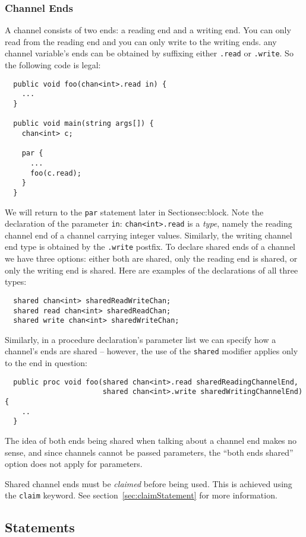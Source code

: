 \documentclass[pdflatex,11pt,letter]{article}
\begin{document}
 


\subsubsection{Channel Ends}

A channel consists of two ends: a reading end and a writing end. You can only read from the reading end and you can only write to the writing ends. any channel variable's ends can be obtained by suffixing either {\tt .read} or {\tt .write}. So the following code is legal:
\begin{verbatim}
  public void foo(chan<int>.read in) {
    ...
  }
  
  public void main(string args[]) {
    chan<int> c;
    
    par {
      ...
      foo(c.read);
    }
  }
\end{verbatim}
We will return to the {\tt par} statement later in Section{sec:block}. Note the declaration of the parameter {\tt in}: {\tt chan<int>.read} is a {\em type}, namely the reading channel end of a channel carrying integer values. Similarly, the writing channel end type is obtained by the {\tt .write} postfix. To declare shared ends of a channel we have three options: either both are shared, only the reading end is shared, or only the writing end is shared. Here are examples of the declarations of all three types:
\begin{verbatim}
  shared chan<int> sharedReadWriteChan;
  shared read chan<int> sharedReadChan;
  shared write chan<int> sharedWriteChan;
\end{verbatim}
Similarly, in a procedure declaration's parameter list we can specify how a channel's ends are shared -- however, the use of the {\tt shared} modifier applies only to the end in question:
\begin{verbatim}
  public proc void foo(shared chan<int>.read sharedReadingChannelEnd,
                       shared chan<int>.write sharedWritingChannelEnd) {
    ..
  }
\end{verbatim}
The idea of both ends being shared when talking about a channel end makes no sense, and since channels cannot be passed parameters, the ``both ends shared'' option does not apply for parameters.

Shared channel ends must be {\em claimed} before being used. This is achieved using the {\tt claim} keyword. See section~\ref{sec:claimStatement} for more information.


\subsection{Statements}
\end{document}
